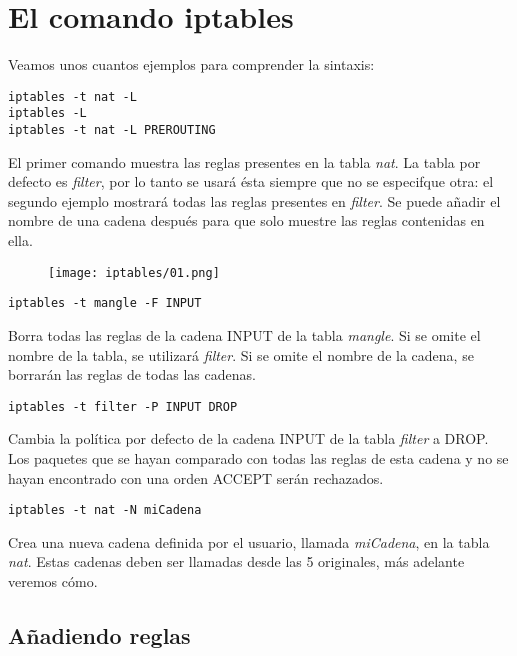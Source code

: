 \section{El comando iptables}

Veamos unos cuantos ejemplos para comprender la sintaxis:

\begin{lstlisting}
iptables -t nat -L
iptables -L
iptables -t nat -L PREROUTING
\end{lstlisting}

El primer comando muestra las reglas presentes en la tabla \textit{nat}. La tabla por defecto es \textit{filter}, por lo tanto se usará ésta siempre que no se especifque otra: el segundo ejemplo mostrará todas las reglas presentes en \textit{filter}. Se puede añadir el nombre de una cadena después para que solo muestre las reglas contenidas en ella.

\begin{figure}[H]
    \centering
    \texttt{[image: iptables/01.png]}
\end{figure}

\begin{lstlisting}
iptables -t mangle -F INPUT
\end{lstlisting}

Borra todas las reglas de la cadena INPUT de la tabla \textit{mangle}. Si se omite el nombre de la tabla, se utilizará \textit{filter}. Si se omite el nombre de la cadena, se borrarán las reglas de todas las cadenas.\\

\begin{lstlisting}
iptables -t filter -P INPUT DROP
\end{lstlisting}

Cambia la política por defecto de la cadena INPUT de la tabla \textit{filter} a DROP. Los paquetes que se hayan comparado con todas las reglas de esta cadena y no se hayan encontrado con una orden ACCEPT serán rechazados.\\

\begin{lstlisting}
iptables -t nat -N miCadena
\end{lstlisting}

Crea una nueva cadena definida por el usuario, llamada \textit{miCadena}, en la tabla \textit{nat}. Estas cadenas deben ser llamadas desde las 5 originales, más adelante veremos cómo.

\subsection{Añadiendo reglas}


